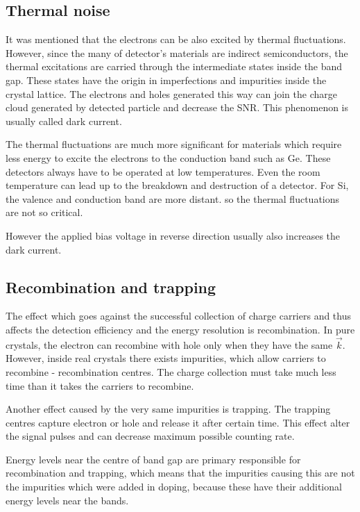 \subsection{Thermal noise}

It was mentioned that the electrons can be also excited by thermal fluctuations. However, since the many of detector's materials are indirect semiconductors, the thermal excitations are carried through the intermediate states inside the band gap. These states have the origin in imperfections and impurities inside the crystal lattice. The electrons and holes generated this way can join the charge cloud generated by detected particle and decrease the SNR. This phenomenon is usually called dark current.

\par
The thermal fluctuations are much more significant for materials which require less energy to excite the electrons to the conduction band such as Ge. These detectors always have to be operated at low temperatures. Even the room temperature can lead up to the breakdown and destruction of a detector. For Si, the valence and conduction band are more distant. so the thermal fluctuations are not so critical.
\par
However the applied bias voltage in reverse direction usually also increases the dark current.


\subsection{Recombination and trapping}
The effect which goes against the successful collection of charge carriers and thus affects the detection efficiency and the energy resolution is recombination. In pure crystals, the electron can recombine with hole only when they have the same $\vec{k}$. However, inside real crystals there exists impurities, which allow carriers to recombine - recombination centres. The charge collection must take much less time than it takes the carriers to recombine. 
\par
Another effect caused by the very same impurities is trapping. The trapping centres capture electron or hole and release it after certain time. This effect alter the signal pulses and can decrease maximum possible counting rate.
\par
Energy levels near the centre of band gap are primary responsible for recombination and trapping, which means that the impurities causing this are not the impurities which were added in doping, because these have their additional energy levels near the bands. 


